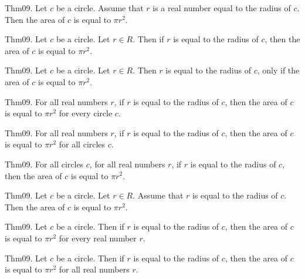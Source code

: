 \documentclass{article}
\begin{document}
Thm09. Let $c$ be a circle. Assume that $r$ is a real number equal to the radius of $c$. Then the area of $c$ is equal to $\pi r ^ {2}$.

Thm09. Let $c$ be a circle. Let $r \in R$. Then if $r$ is equal to the radius of $c$, then the area of $c$ is equal to $\pi r ^ {2}$.

Thm09. Let $c$ be a circle. Let $r \in R$. Then $r$ is equal to the radius of $c$, only if the area of $c$ is equal to $\pi r ^ {2}$.

Thm09. For all real numbers $r$, if $r$ is equal to the radius of $c$, then the area of $c$ is equal to $\pi r ^ {2}$ for every circle $c$.

Thm09. For all real numbers $r$, if $r$ is equal to the radius of $c$, then the area of $c$ is equal to $\pi r ^ {2}$ for all circles $c$.

Thm09. For all circles $c$, for all real numbers $r$, if $r$ is equal to the radius of $c$, then the area of $c$ is equal to $\pi r ^ {2}$.

Thm09. Let $c$ be a circle. Let $r \in R$. Assume that $r$ is equal to the radius of $c$. Then the area of $c$ is equal to $\pi r ^ {2}$.

Thm09. Let $c$ be a circle. Then if $r$ is equal to the radius of $c$, then the area of $c$ is equal to $\pi r ^ {2}$ for every real number $r$.

Thm09. Let $c$ be a circle. Then if $r$ is equal to the radius of $c$, then the area of $c$ is equal to $\pi r ^ {2}$ for all real numbers $r$.
\end{document}
